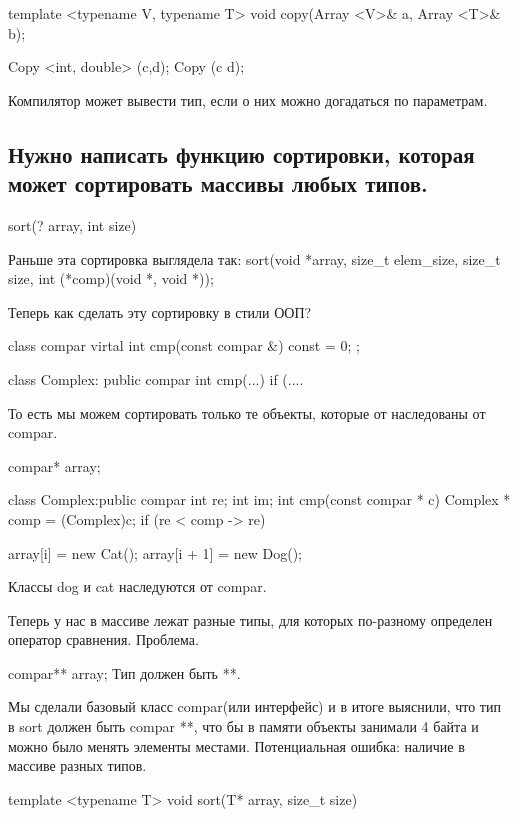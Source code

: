 \begin{cppcode}
template <typename V, typename T>
void copy(Array <V>& a, Array <T>& b);

Copy <int, double> (c,d);
Copy (c d);
\end{cppcode}

Компилятор может вывести тип, если о них можно догадаться по параметрам. 

\subsection{Нужно написать функцию сортировки, которая может сортировать массивы любых типов.}

sort(? array, int size)

Раньше эта сортировка выглядела так:
sort(void *array, size\_t elem\_size, size\_t size, int (*comp)(void *, void *));

Теперь как сделать эту сортировку в стили ООП?

\begin{cppcode}
class compar{
    virtal int cmp(const compar &) const = 0;
};

class Complex: public compar{
    int cmp(...) {
        if (....
    }
}
\end{cppcode}

То есть мы можем сортировать только те объекты, которые от наследованы от compar.

\begin{cppcode}
compar* array;

class Complex:public compar{
    int re;
    int im;
    int cmp(const compar * c) {
        Complex * comp = (Complex)c;
        if (re < comp -> re)
    }
}

array[i] = new Cat();
array[i + 1] = new Dog();
\end{cppcode}

Классы dog и cat наследуются от compar.

Теперь у нас в массиве лежат разные типы, для которых по-разному определен оператор сравнения. Проблема. 

compar** array;  Тип должен быть **.

Мы сделали базовый класс compar(или интерфейс) и в итоге выяснили, что тип в sort должен быть compar **, что бы в памяти объекты занимали 4 байта и 
можно было менять элементы местами. Потенциальная ошибка: наличие в массиве разных типов. 

\begin{cppcode}
template <typename T>
void sort(T* array, size_t size) {
}
\end{cppcode}

